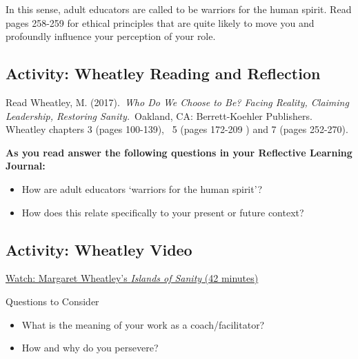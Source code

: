 \documentclass[
]{book}
\providecommand{\tightlist}{%
  \setlength{\itemsep}{0pt}\setlength{\parskip}{0pt}}
\begin{document}
In this sense, adult educators are called to be warriors for the human spirit. Read pages 258-259 for ethical principles that are quite likely to move you and profoundly influence your perception of your role.

\hypertarget{activity-wheatley-reading-and-reflection-1}{%
\subsection*{Activity: Wheatley Reading and Reflection}\label{activity-wheatley-reading-and-reflection-1}}

\begin{reflect}
Read Wheatley, M. (2017).~\emph{Who Do We Choose to Be? Facing Reality, Claiming Leadership, Restoring Sanity.}~Oakland, CA: Berrett-Koehler Publishers. Wheatley chapters 3 (pages 100-139), ~5 (pages 172-209 ) and 7 (pages 252-270).

\textbf{As you read answer the following questions in your Reflective Learning Journal:}

\begin{itemize}
\tightlist
\item
  How are adult educators `warriors for the human spirit'?\\
\item
  How does this relate specifically to your present or future context?
\end{itemize}
\end{reflect}

\hypertarget{activity-wheatley-video}{%
\subsection*{Activity: Wheatley Video}\label{activity-wheatley-video}}

\begin{reflect}
\href{https://www.youtube.com/watch?v=LtaYNxp56gs}{Watch: Margaret Wheatley's \emph{Islands of Sanity} (42 minutes)}

{Questions to Consider}

\begin{itemize}
\tightlist
\item
  What is the meaning of your work as a coach/facilitator?\\
\item
  How and why do you persevere?
\end{itemize}
\end{reflect}
\end{document}
